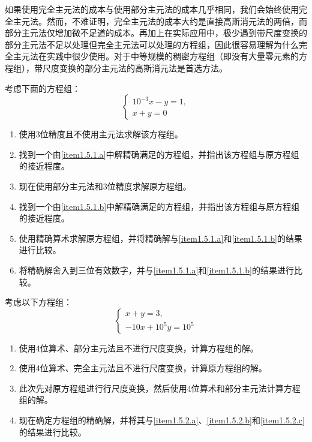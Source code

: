 如果使用完全主元法的成本与使用部分主元法的成本几乎相同，我们会始终使用完全主元法。然而，不难证明，完全主元法的成本大约是直接高斯消元法的两倍，而部分主元法仅增加微不足道的成本。再加上在实际应用中，极少遇到带尺度变换的部分主元法不足以处理但完全主元法可以处理的方程组，因此很容易理解为什么完全主元法在实践中很少使用。对于中等规模的稠密方程组（即没有大量零元素的方程组），带尺度变换的部分主元法的高斯消元法是首选方法。

\begin{exercise}
考虑下面的方程组：
$$
\begin{cases} 
10^{-3}x - y = 1, \\
x + y = 0
\end{cases}
$$
\begin{enumerate}[label=(\alph*)]
    \item 使用3位精度且不使用主元法求解该方程组。\label{item1.5.1.a}
    \item 找到一个由\ref{item1.5.1.a}中解精确满足的方程组，并指出该方程组与原方程组的接近程度。
    \item 现在使用部分主元法和3位精度求解原方程组。\label{item1.5.1.b}
    \item 找到一个由\ref{item1.5.1.b}中解精确满足的方程组，并指出该方程组与原方程组的接近程度。
    \item 使用精确算术求解原方程组，并将精确解与\ref{item1.5.1.a}和\ref{item1.5.1.b}的结果进行比较。
    \item 将精确解舍入到三位有效数字，并与\ref{item1.5.1.a}和\ref{item1.5.1.b}的结果进行比较。
\end{enumerate}
\end{exercise}

\begin{exercise}
考虑以下方程组：
$$
\begin{cases} 
    x + y = 3, \\
 -10x + 10^5y = 10^5
\end{cases}
$$
\begin{enumerate}[label=(\alph*)]
    \item 使用4位算术、部分主元法且不进行尺度变换，计算方程组的解。\label{item1.5.2.a}
    \item 使用4位算术、完全主元法且不进行尺度变换，计算原方程组的解。\label{item1.5.2.b}
    \item 此次先对原方程组进行行尺度变换，然后使用4位算术和部分主元法计算方程组的解。\label{item1.5.2.c}
    \item 现在确定方程组的精确解，并将其与\ref{item1.5.2.a}、\ref{item1.5.2.b}和\ref{item1.5.2.c}的结果进行比较。
\end{enumerate}
\end{exercise}

